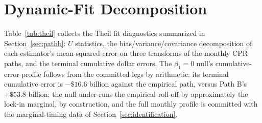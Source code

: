 \documentclass[12pt]{article}
\begin{document}
\section{Dynamic-Fit Decomposition}\label{app:theil}

Table~\ref{tab:theil} collects the Theil fit diagnostics summarized in Section~\ref{sec:pathb}: $U$ statistics, the bias/variance/covariance decomposition of each estimator's mean-squared error on three transforms of the monthly CPR paths, and the terminal cumulative dollar errors. The $\beta_1 = 0$ null's cumulative-error profile follows from the committed legs by arithmetic: its terminal cumulative error is $-\$16.6$ billion against the empirical path, versus Path B's $+\$53.8$ billion; the null under-runs the empirical roll-off by approximately the lock-in marginal, by construction, and the full monthly profile is committed with the marginal-timing data of Section~\ref{sec:identification}.
\end{document}
